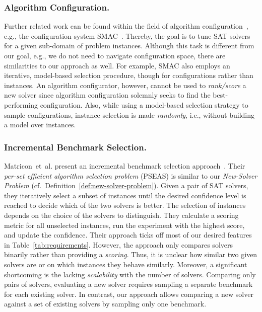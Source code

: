 \documentclass[runningheads]{llncs}
\begin{document}
\subsubsection{Algorithm Configuration.}

Further related work can be found within the field of algorithm configuration~\cite{HoosHL21,Stutzle0P22}, e.g., the configuration system SMAC~\cite{HutterHL11}.
Thereby, the goal is to tune SAT solvers for a given sub-domain of problem instances.
Although this task is different from our goal, e.g., we do not need to navigate configuration space, there are similarities to our approach as well.
For example, SMAC also employs an iterative, model-based selection procedure, though for configurations rather than instances.
An algorithm configurator, however, cannot be used to \emph{rank/score} a new solver since algorithm configuration solemnly seeks to find the best-performing configuration.
Also, while using a model-based selection strategy to sample configurations, instance selection is made \emph{randomly}, i.e., without building a model over instances.

\subsubsection{Incremental Benchmark Selection.}

Matricon~et~al. present an incremental benchmark selection approach~\cite{MatriconAFSH21}.
Their \emph{per-set efficient algorithm selection problem} (PSEAS) is similar to our \emph{New-Solver Problem} (cf.~Definition~\ref{def:new-solver-problem}).
Given a pair of SAT solvers, they iteratively select a subset of instances until the desired confidence level is reached to decide which of the two solvers is better.
The selection of instances depends on the choice of the solvers to distinguish.
They calculate a scoring metric for all unselected instances, run the experiment with the highest score, and update the confidence.
Their approach ticks off most of our desired features in Table~\ref{tab:requirements}.
However, the approach only compares solvers binarily rather than providing a \emph{scoring}.
Thus, it is unclear how similar two given solvers are or on which instances they behave similarly.
Moreover, a significant shortcoming is the lacking \emph{scalability} with the number of solvers.
Comparing only pairs of solvers, evaluating a new solver requires sampling a separate benchmark for each existing solver.
In contrast, our approach allows comparing a new solver against a set of existing solvers by sampling only one benchmark.
\end{document}
